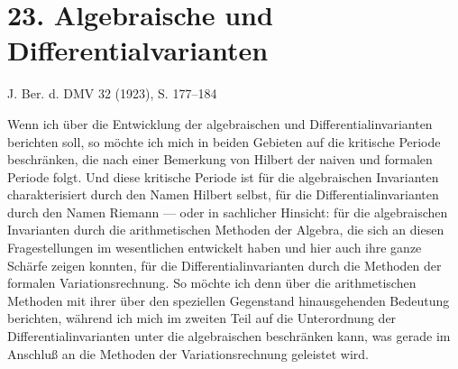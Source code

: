 \documentclass[11pt]{article}
\begin{document}
\setcounter{footnote}{0}

\section*{23. Algebraische und Differentialvarianten}
\begin{center}
J. Ber. d. DMV 32 (1923), S. 177--184
\end{center}

Wenn ich über die Entwicklung der algebraischen und Differentialinvarianten berichten soll, so möchte ich mich in beiden Gebieten auf die kritische Periode beschränken, die nach einer Bemerkung von Hilbert der naiven und formalen Periode folgt. Und diese kritische Periode ist für die algebraischen Invarianten charakterisiert durch den Namen Hilbert selbst, für die Differentialinvarianten durch den Namen Riemann --- oder in sachlicher Hinsicht: für die algebraischen Invarianten durch die arithmetischen Methoden der Algebra, die sich an diesen Fragestellungen im wesentlichen entwickelt haben und hier auch ihre ganze Schärfe zeigen konnten, für die Differentialinvarianten durch die Methoden der formalen Variationsrechnung. So möchte ich denn über die arithmetischen Methoden mit ihrer über den speziellen Gegenstand hinausgehenden Bedeutung berichten, während ich mich im zweiten Teil auf die Unterordnung der Differentialinvarianten unter die algebraischen beschränken kann, was gerade im Anschluß an die Methoden der Variationsrechnung geleistet wird.
\end{document}
